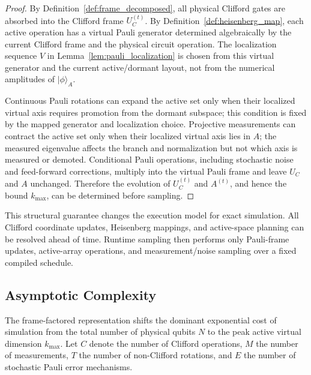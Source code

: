 \documentclass[a4paper, onecolumn, unpublished]{quantumarticle}
\begin{document}
    \begin{proof}
    By Definition~\ref{def:frame_decomposed}, all physical Clifford gates are absorbed into the Clifford frame $U_C^{(t)}$. By Definition~\ref{def:heisenberg_map}, each active operation has a virtual Pauli generator determined algebraically by the current Clifford frame and the physical circuit operation. The localization sequence $V$ in Lemma~\ref{lem:pauli_localization} is chosen from this virtual generator and the current active/dormant layout, not from the numerical amplitudes of $|\phi\rangle_A$.

    Continuous Pauli rotations can expand the active set only when their localized virtual axis requires promotion from the dormant subspace; this condition is fixed by the mapped generator and localization choice. Projective measurements can contract the active set only when their localized virtual axis lies in $A$; the measured eigenvalue affects the branch and normalization but not which axis is measured or demoted. Conditional Pauli operations, including stochastic noise and feed-forward corrections, multiply into the virtual Pauli frame and leave $U_C$ and $A$ unchanged. Therefore the evolution of $U_C^{(t)}$ and $A^{(t)}$, and hence the bound $k_{\max}$, can be determined before sampling.
    \end{proof}

    This structural guarantee changes the execution model for exact simulation. All Clifford coordinate updates, Heisenberg mappings, and active-space planning can be resolved ahead of time. Runtime sampling then performs only Pauli-frame updates, active-array operations, and measurement/noise sampling over a fixed compiled schedule.

    \subsection{Asymptotic Complexity}
    \label{sec:complexity}

    The frame-factored representation shifts the dominant exponential cost of simulation from the total number of physical qubits $N$ to the peak active virtual dimension $k_{\max}$. Let $C$ denote the number of Clifford operations, $M$ the number of measurements, $T$ the number of non-Clifford rotations, and $E$ the number of stochastic Pauli error mechanisms.
\end{document}
